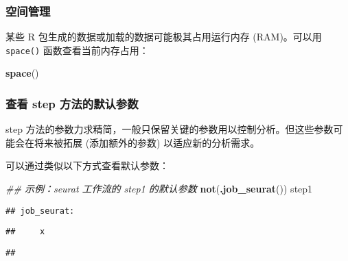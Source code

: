 \documentclass[
]{article}
\newenvironment{Shaded}{\begin{snugshade}}{\end{snugshade}}
\newcommand{\CommentTok}[1]{\textcolor[rgb]{0.56,0.35,0.01}{\textit{#1}}}
\newcommand{\KeywordTok}[1]{\textcolor[rgb]{0.13,0.29,0.53}{\textbf{#1}}}
\newcommand{\NormalTok}[1]{#1}
\newcommand{\OperatorTok}[1]{\textcolor[rgb]{0.81,0.36,0.00}{\textbf{#1}}}
\begin{document}
\begin{Shaded}
\end{Shaded}

\hypertarget{ux7a7aux95f4ux7ba1ux7406}{%
\subsubsection{空间管理}\label{ux7a7aux95f4ux7ba1ux7406}}

某些 R 包生成的数据或加载的数据可能极其占用运行内存 (RAM)。可以用 \texttt{space()} 函数查看当前内存占用：

\begin{Shaded}
\begin{Highlighting}[]
\KeywordTok{space}\NormalTok{()}
\end{Highlighting}
\end{Shaded}

\hypertarget{ux67e5ux770b-step-ux65b9ux6cd5ux7684ux9ed8ux8ba4ux53c2ux6570}{%
\subsubsection{查看 step 方法的默认参数}\label{ux67e5ux770b-step-ux65b9ux6cd5ux7684ux9ed8ux8ba4ux53c2ux6570}}

step 方法的参数力求精简，一般只保留关键的参数用以控制分析。但这些参数可能会在将来被拓展 (添加额外的参数) 以适应新的分析需求。

可以通过类似以下方式查看默认参数：

\begin{Shaded}
\begin{Highlighting}[]
\CommentTok{\#\# 示例：seurat 工作流的 step1 的默认参数}
\KeywordTok{not}\NormalTok{(}\KeywordTok{.job\_seurat}\NormalTok{())}
\NormalTok{step1}
\end{Highlighting}
\end{Shaded}

\begin{verbatim}
## job_seurat:
\end{verbatim}

\begin{verbatim}
##     x
\end{verbatim}

\begin{verbatim}
## 
\end{verbatim}
\end{document}
